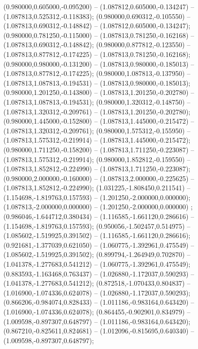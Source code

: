  (0.980000,0.605000,-0.095200) -- (1.087812,0.605000,-0.134247) -- (1.087813,0.525312,-0.118383);
 (0.980000,0.690312,-0.105550) -- (1.087813,0.690312,-0.148842) -- (1.087812,0.605000,-0.134247);
 (0.980000,0.781250,-0.115000) -- (1.087813,0.781250,-0.162168) -- (1.087813,0.690312,-0.148842);
 (0.980000,0.877812,-0.123550) -- (1.087813,0.877812,-0.174225) -- (1.087813,0.781250,-0.162168);
 (0.980000,0.980000,-0.131200) -- (1.087813,0.980000,-0.185013) -- (1.087813,0.877812,-0.174225);
 (0.980000,1.087813,-0.137950) -- (1.087813,1.087813,-0.194531) -- (1.087813,0.980000,-0.185013);
 (0.980000,1.201250,-0.143800) -- (1.087813,1.201250,-0.202780) -- (1.087813,1.087813,-0.194531);
 (0.980000,1.320312,-0.148750) -- (1.087813,1.320312,-0.209761) -- (1.087813,1.201250,-0.202780);
 (0.980000,1.445000,-0.152800) -- (1.087813,1.445000,-0.215472) -- (1.087813,1.320312,-0.209761);
 (0.980000,1.575312,-0.155950) -- (1.087813,1.575312,-0.219914) -- (1.087813,1.445000,-0.215472);
 (0.980000,1.711250,-0.158200) -- (1.087813,1.711250,-0.223087) -- (1.087813,1.575312,-0.219914);
 (0.980000,1.852812,-0.159550) -- (1.087813,1.852812,-0.224990) -- (1.087813,1.711250,-0.223087);
 (0.980000,2.000000,-0.160000) -- (1.087813,2.000000,-0.225625) -- (1.087813,1.852812,-0.224990);
 (1.031225,-1.808450,0.211541) -- (1.154698,-1.819763,0.157593) -- (1.201250,-2.000000,0.000000);
 (1.087813,-2.000000,0.000000) -- (1.201250,-2.000000,0.000000) ;
 (0.986046,-1.644712,0.380434) -- (1.116585,-1.661120,0.286616) -- (1.154698,-1.819763,0.157593);
 (0.950056,-1.502457,0.514975) -- (1.085602,-1.519925,0.391502) -- (1.116585,-1.661120,0.286616);
 (0.921681,-1.377039,0.621050) -- (1.060775,-1.392961,0.475549) -- (1.085602,-1.519925,0.391502);
 (0.899794,-1.264949,0.702870) -- (1.041378,-1.277683,0.541212) -- (1.060775,-1.392961,0.475549);
 (0.883593,-1.163468,0.763437) -- (1.026880,-1.172037,0.590293) -- (1.041378,-1.277683,0.541212);
 (0.872518,-1.070433,0.804837) -- (1.016900,-1.074336,0.624078) -- (1.026880,-1.172037,0.590293);
 (0.866206,-0.984074,0.828433) -- (1.011186,-0.983164,0.643420) -- (1.016900,-1.074336,0.624078);
 (0.864455,-0.902901,0.834979) -- (1.009598,-0.897307,0.648797) -- (1.011186,-0.983164,0.643420);
 (0.867210,-0.825611,0.824681) -- (1.012096,-0.815695,0.640340) -- (1.009598,-0.897307,0.648797);
